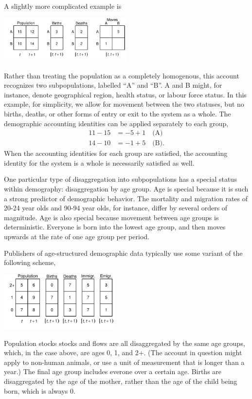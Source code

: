 \documentclass[USenglish]{article}
\begin{document}
A slightly more complicated example is
\begin{center}
\includegraphics[width=0.5\textwidth]{figures_accounts/fig_account_region.pdf}
\end{center}
Rather than treating the population as a completely homogenous, this account recognizes two subpopulations, labelled ``A'' and ``B''. A and B might, for instance, denote geographical region, health status, or labour force status. In this example, for simplicity, we allow for movement between the two statuses, but no births, deaths, or other forms of entry or exit to the system as a whole. The demographic accounting identities can be applied separately to each group,
\begin{align*}
    11 - 15 & = -5 + 1 \quad \text{(A)}\\
    14 - 10 & = -1 + 5 \quad \text{(B)}.
\end{align*}
When the accounting identities for each group are satisfied, the accounting identity for the system is a whole is necessarily satisfied as well.

One particular type of disaggregation into subpopulations has a special status within demography: disaggregation by age group. Age is special because it is such a strong predictor of demographic behavior. The mortality and migration rates of 20-24 year olds and 90-94 year olds, for instance, differ by several orders of magnitude. Age is also special because movement between age groups is deterministic. Everyone is born into the lowest age group, and then moves upwards at the rate of one age group per period.

Publishers of age-structured demographic data typically use some variant of the following scheme,
\begin{center}
\includegraphics[width=0.45\textwidth]{figures_accounts/fig_account_withage_nolex}
\end{center}
Population stocks stocks and flows are all disaggregated by the same age groups, which, in the case above, are ages 0, 1, and 2+. (The account in question might apply to non-human animals, or use a unit of measurement that is longer than a year.) The final age group includes everone over a certain age. Births are disaggregated by the age of the mother, rather than the age of the child being born, which is always 0. 
\end{document}
